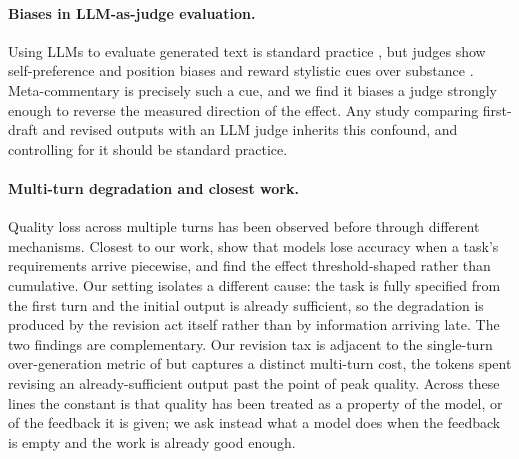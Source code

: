 \paragraph{Biases in LLM-as-judge evaluation.}
Using LLMs to evaluate generated text is standard practice \cite{zheng2024judging,
li2024generation}, but judges show self-preference and position biases
\cite{panickssery2024llm, koo2024benchmarking} and reward stylistic cues over substance \cite{wu2023style, zhang2024lists, chen2024humans,
ye2024justice}. Meta-commentary is precisely such a cue, and we find it biases a judge strongly enough to
reverse the measured direction of the effect. Any study comparing first-draft and revised
outputs with an LLM judge inherits this confound, and controlling for it should be standard
practice.

\paragraph{Multi-turn degradation and closest work.}
Quality loss across multiple turns has been observed before through different mechanisms.
Closest to our work, \citet{laban2025lost}
show that models lose accuracy when a task's requirements arrive piecewise, and find the
effect threshold-shaped rather than cumulative. Our setting isolates a different cause: the
task is fully specified from the first turn and the initial output is already sufficient,
so the degradation is produced by the revision act itself rather than by information
arriving late. The two findings are complementary. Our revision tax is adjacent to the single-turn over-generation metric of \citet{borisov2026yapbench} but captures a distinct multi-turn cost, the tokens spent revising an already-sufficient
output past the point of peak quality. Across these lines the constant is that quality has
been treated as a property of the model, or of the feedback it is given; we ask instead what
a model does when the feedback is empty and the work is already good enough.

